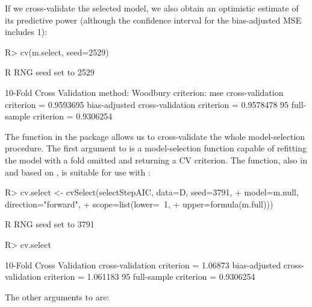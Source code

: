 \documentclass[
]{jss}
\begin{document}
If we cross-validate the selected model, we also obtain an optimistic
estimate of its predictive power (although the confidence interval for
the bias-adjusted MSE includes 1):

\begin{CodeChunk}
\begin{CodeInput}
R> cv(m.select, seed=2529)
\end{CodeInput}
\begin{CodeOutput}
R RNG seed set to 2529
\end{CodeOutput}
\begin{CodeOutput}
10-Fold Cross Validation
method: Woodbury
criterion: mse
cross-validation criterion = 0.9593695
bias-adjusted cross-validation criterion = 0.9578478
95%
full-sample criterion = 0.9306254 
\end{CodeOutput}
\end{CodeChunk}

The  function in the  package allows us to
cross-validate the whole model-selection procedure. The first argument
to  is a model-selection function capable of refitting
the model with a fold omitted and returning a CV criterion. The
 function, also in  and based on
, is suitable for use with :

\begin{CodeChunk}
\begin{CodeInput}
R> cv.select <- cvSelect(selectStepAIC, data=D, seed=3791,
+                       model=m.null, direction="forward",
+                       scope=list(lower=~1, 
+                                  upper=formula(m.full)))
\end{CodeInput}
\begin{CodeOutput}
R RNG seed set to 3791
\end{CodeOutput}
\begin{CodeInput}
R> cv.select
\end{CodeInput}
\begin{CodeOutput}
10-Fold Cross Validation
cross-validation criterion = 1.06873
bias-adjusted cross-validation criterion = 1.061183
95%
full-sample criterion = 0.9306254 
\end{CodeOutput}
\end{CodeChunk}

The other arguments to  are:
\end{document}
